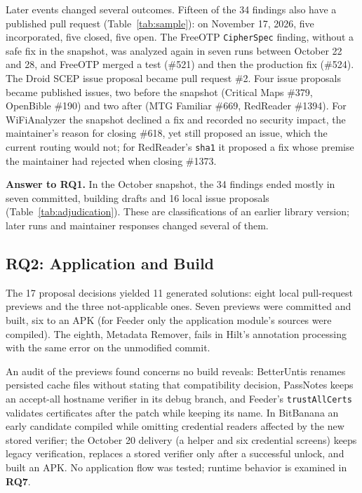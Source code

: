 \documentclass[conference]{IEEEtran}
\newcommand{\researchq}[1]{\textbf{RQ#1}}
\begin{document}
Later events changed several outcomes. Fifteen of the 34 findings also have a
published pull request (Table~\ref{tab:sample}): on November 17, 2026, five
incorporated, five closed, five open. The FreeOTP \texttt{CipherSpec} finding,
without a safe fix in the snapshot, was analyzed again in seven runs between
October 22 and 28, and FreeOTP merged a test (\#521) and then the production
fix (\#524). The Droid SCEP issue proposal became pull request \#2. Four issue
proposals became published issues, two before the snapshot (Critical Maps
\#379, OpenBible \#190) and two after (MTG Familiar \#669, RedReader \#1394).
For WiFiAnalyzer the snapshot declined a fix and recorded no security impact,
the maintainer's reason for closing \#618, yet still proposed an issue, which
the current routing would not; for RedReader's \texttt{sha1} it proposed a fix
whose premise the maintainer had rejected when closing \#1373.

\textbf{Answer to \researchq{1}.} In the October snapshot, the 34 findings
ended mostly in seven committed, building drafts and 16 local issue proposals
(Table~\ref{tab:adjudication}). These are classifications of an earlier library version;
later runs and maintainer responses changed several of them.

\subsection{\researchq{2}: Application and Build}
\label{subsec:rq2}

The 17 proposal decisions yielded 11 generated solutions: eight local
pull-request previews and the three not-applicable ones. Seven previews were
committed and built, six to an APK (for Feeder only the application module's
sources were compiled). The eighth, Metadata Remover, fails in Hilt's
annotation processing with the same error on the unmodified commit.

An audit of the previews found concerns no build reveals: BetterUntis renames
persisted cache files without stating that compatibility decision, PassNotes
keeps an accept-all hostname verifier in its debug branch, and Feeder's
\texttt{trustAllCerts} validates certificates after the patch while keeping
its name. In BitBanana an early candidate compiled while omitting credential
readers affected by the new stored verifier; the October 20 delivery (a
helper and six credential screens) keeps legacy verification, replaces a
stored verifier only after a successful unlock, and built an APK. No
application flow was tested; runtime behavior is examined in \researchq{7}.
\end{document}
